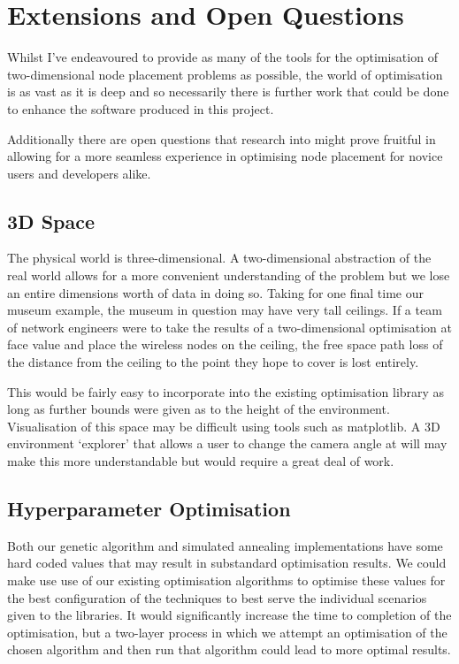 \section{Extensions and Open Questions}
	\label{sec:extensions}
	Whilst I've endeavoured to provide as many of the tools for the optimisation of two-dimensional node placement problems as possible, the world of optimisation is as vast as it is deep and so necessarily there is further work that could be done to enhance the software produced in this project.

	Additionally there are open questions that research into might prove fruitful in allowing for a more seamless experience in optimising node placement for novice users and developers alike. 

	\subsection{3D Space}
		\label{sec:extensions_3d} 
		The physical world is three-dimensional. A two-dimensional abstraction of the real world allows for a more convenient understanding of the problem but we lose an entire dimensions worth of data in doing so. Taking for one final time our museum example, the museum in question may have very tall ceilings. If a team of network engineers were to take the results of a two-dimensional optimisation at face value and place the wireless nodes on the ceiling, the free space path loss of the distance from the ceiling to the point they hope to cover is lost entirely.

		This would be fairly easy to incorporate into the existing optimisation library as long as further bounds were given as to the height of the environment. Visualisation of this space may be difficult using tools such as matplotlib. A 3D environment `explorer' that allows a user to change the camera angle at will may make this more understandable but would require a great deal of work.

	\subsection{Hyperparameter Optimisation}  
		\label{sec:extensions_hyperparameter}
		Both our genetic algorithm and simulated annealing implementations have some hard coded values that may result in substandard optimisation results. We could make use use of our existing optimisation algorithms to optimise these values for the best configuration of the techniques to best serve the individual scenarios given to the libraries. It would significantly increase the time to completion of the optimisation, but a two-layer process in which we attempt an optimisation of the chosen algorithm and then run that algorithm could lead to more optimal results.
		
